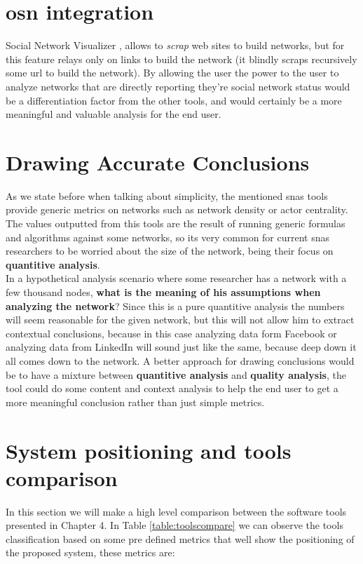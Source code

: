 \section{\acrfull{osn} integration}
Social Network Visualizer \cite{socnetv}, allows to \textit{scrap} web sites to build networks, but for this feature relays only on links to build the network (it blindly scraps recursively some url to build the network). By allowing the user the power to the user to analyze networks that are directly reporting they're social network status would be a differentiation factor from the other tools, and would certainly be a more meaningful and valuable analysis for the end user.

\section{Drawing Accurate Conclusions}
As we state before when talking about simplicity, the mentioned \glspl{sna} tools provide generic metrics on networks such as network density or actor centrality. The values outputted from this tools are the result of running generic formulas and algorithms against some networks, so its very common for current \glspl{sna} researchers to be worried about the size of the network, being their focus on \textbf{quantitive analysis}.\\
\indent In a hypothetical analysis scenario where some researcher has a network with a few thousand nodes, \textbf{what is the meaning of his assumptions when analyzing the network}? Since this is a pure quantitive analysis the numbers will seem reasonable for the given network, but this will not allow him to extract contextual conclusions, because in this case analyzing data form Facebook or analyzing data from LinkedIn will sound just like the same, because deep down it all comes down to the network. A better approach for drawing conclusions would be to have a mixture between \textbf{quantitive analysis} and \textbf{quality analysis}, the tool could do some content and context analysis to help the end user to get a more meaningful conclusion rather than just simple metrics.

\section{System positioning and tools comparison}
In this section we will make a high level comparison between the software tools presented in Chapter 4. In Table \ref{table:toolscompare} we can observe the tools classification based on some pre defined metrics that well show the positioning of the proposed system, these metrics are:

